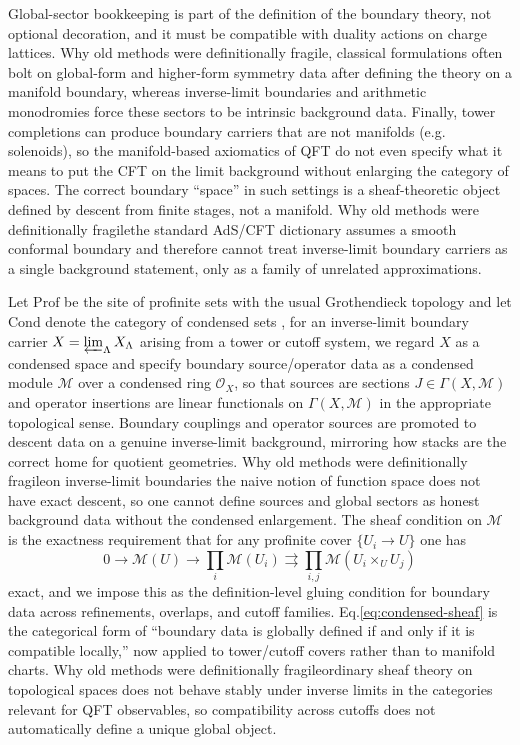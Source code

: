 \documentclass[11pt]{article}
\theoremstyle{remark}
\begin{document}
Global-sector bookkeeping is part of the definition of the boundary theory, not optional decoration, and it must be compatible with duality actions on charge lattices. Why old methods were definitionally fragile, classical formulations often bolt on global-form and higher-form symmetry data after defining the theory on a manifold boundary, whereas inverse-limit boundaries and arithmetic monodromies force these sectors to be intrinsic background data. Finally, tower completions can produce boundary carriers that are not manifolds (e.g. solenoids), so the manifold-based axiomatics of QFT do not even specify what it means to put the CFT on the limit background without enlarging the category of spaces. The correct boundary ``space'' in such settings is a sheaf-theoretic object defined by descent from finite stages, not a manifold. Why old methods were definitionally fragile\:the standard AdS/CFT dictionary assumes a smooth conformal boundary and therefore cannot treat inverse-limit boundary carriers as a single background statement, only as a family of unrelated approximations.

Let \(\mathrm{Prof}\) be the site of profinite sets with the usual Grothendieck topology and let \(\mathrm{Cond}\) denote the category of condensed sets \cite{ClausenScholze}, for an inverse-limit boundary carrier \(X=\varprojlim_{\Lambda}X_{\Lambda}\) arising from a tower or cutoff system, we regard \(X\) as a condensed space and specify boundary source/operator data as a condensed module \(\mathcal{M}\) over a condensed ring \(\mathcal{O}_{X}\), so that sources are sections \(J\in \Gamma(X,\mathcal{M})\) and operator insertions are linear functionals on \(\Gamma(X,\mathcal{M})\) in the appropriate topological sense. Boundary couplings and operator sources are promoted to descent data on a genuine inverse-limit background, mirroring how stacks are the correct home for quotient geometries. Why old methods were definitionally fragile\:on inverse-limit boundaries the naive notion of function space does not have exact descent, so one cannot define sources and global sectors as honest background data without the condensed enlargement. The sheaf condition on \(\mathcal{M}\) is the exactness requirement that for any profinite cover \(\{U_i\to U\}\) one has
\begin{equation}\label{eq:condensed-sheaf}
0\to \mathcal{M}(U)\to \prod_i \mathcal{M}(U_i)\rightrightarrows \prod_{i,j}\mathcal{M}(U_i\times_U U_j)
\end{equation}
exact, and we impose this as the definition-level gluing condition for boundary data across refinements, overlaps, and cutoff families. Eq.\eqref{eq:condensed-sheaf} is the categorical form of ``boundary data is globally defined if and only if it is compatible locally,'' now applied to tower/cutoff covers rather than to manifold charts. Why old methods were definitionally fragile\:ordinary sheaf theory on topological spaces does not behave stably under inverse limits in the categories relevant for QFT observables, so compatibility across cutoffs does not automatically define a unique global object.
\end{document}
